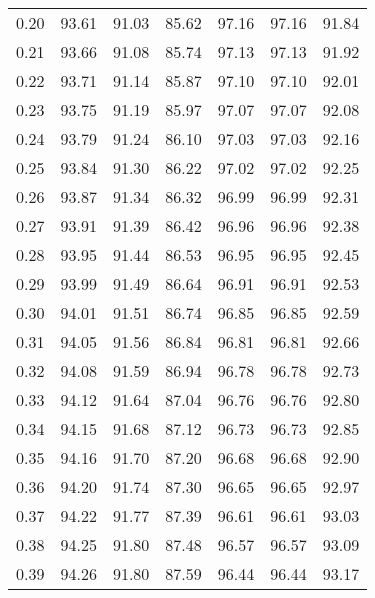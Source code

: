 \begin{tabular}{|c|c|c|c|c|c|c|}
      0.20 &     93.61 &     91.03 &      85.62 &   97.16 &      97.16 &         91.84 \\
      0.21 &     93.66 &     91.08 &      85.74 &   97.13 &      97.13 &         91.92 \\
      0.22 &     93.71 &     91.14 &      85.87 &   97.10 &      97.10 &         92.01 \\
      0.23 &     93.75 &     91.19 &      85.97 &   97.07 &      97.07 &         92.08 \\
      0.24 &     93.79 &     91.24 &      86.10 &   97.03 &      97.03 &         92.16 \\
      0.25 &     93.84 &     91.30 &      86.22 &   97.02 &      97.02 &         92.25 \\
      0.26 &     93.87 &     91.34 &      86.32 &   96.99 &      96.99 &         92.31 \\
      0.27 &     93.91 &     91.39 &      86.42 &   96.96 &      96.96 &         92.38 \\
      0.28 &     93.95 &     91.44 &      86.53 &   96.95 &      96.95 &         92.45 \\
      0.29 &     93.99 &     91.49 &      86.64 &   96.91 &      96.91 &         92.53 \\
      0.30 &     94.01 &     91.51 &      86.74 &   96.85 &      96.85 &         92.59 \\
      0.31 &     94.05 &     91.56 &      86.84 &   96.81 &      96.81 &         92.66 \\
      0.32 &     94.08 &     91.59 &      86.94 &   96.78 &      96.78 &         92.73 \\
      0.33 &     94.12 &     91.64 &      87.04 &   96.76 &      96.76 &         92.80 \\
      0.34 &     94.15 &     91.68 &      87.12 &   96.73 &      96.73 &         92.85 \\
      0.35 &     94.16 &     91.70 &      87.20 &   96.68 &      96.68 &         92.90 \\
      0.36 &     94.20 &     91.74 &      87.30 &   96.65 &      96.65 &         92.97 \\
      0.37 &     94.22 &     91.77 &      87.39 &   96.61 &      96.61 &         93.03 \\
      0.38 &     94.25 &     91.80 &      87.48 &   96.57 &      96.57 &         93.09 \\
      0.39 &     94.26 &     91.80 &      87.59 &   96.44 &      96.44 &         93.17 \\

\end{tabular}
